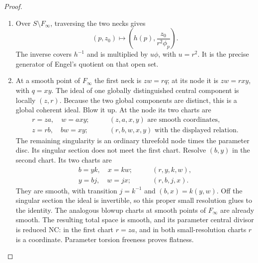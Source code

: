 \begin{proof}
\begin{enumerate}[label=\arabic*.,leftmargin=*]
\item Over $S\setminus F_\infty$, traversing the two necks gives
\[
 (p,z_0)\longmapsto\left(h(p),\frac{z_0}{r^2\phi_p}\right).
\]
The inverse covers $h^{-1}$ and is multiplied by $u\phi$, with $u=r^2$. It is the precise generator of Engel's quotient on that open set.

\item At a smooth point of $F_\infty$ the first neck is $zw=rq$; at its node it is $zw=rxy$, with $q=xy$. The ideal of one globally distinguished central component is locally $(z,r)$. Because the two global components are distinct, this is a global coherent ideal. Blow it up. At the node its two charts are
\begin{align*}
 r=za,\quad w=axy;&\qquad (z,a,x,y)\text{ are smooth coordinates},\\
 z=rb,\quad bw=xy;&\qquad (r,b,w,x,y)\text{ with the displayed relation}.
\end{align*}
The remaining singularity is an ordinary threefold node times the parameter disc. Its singular section does not meet the first chart. Resolve $(b,y)$ in the second chart. Its two charts are
\begin{align*}
 b=yk,\quad x=kw;&\qquad (r,y,k,w),\\
 y=bj,\quad w=jx;&\qquad (r,b,j,x).
\end{align*}
They are smooth, with transition $j=k^{-1}$ and $(b,x)=k(y,w)$. Off the singular section the ideal is invertible, so this proper small resolution glues to the identity. The analogous blowup charts at smooth points of $F_\infty$ are already smooth. The resulting total space is smooth, and its parameter central divisor is reduced NC: in the first chart $r=za$, and in both small-resolution charts $r$ is a coordinate. Parameter torsion freeness proves flatness.


\end{enumerate}
\end{proof}
